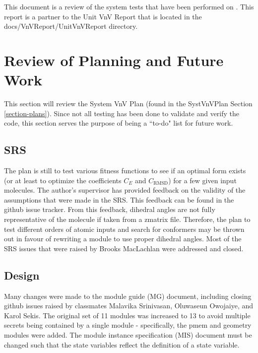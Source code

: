 \documentclass[12pt, titlepage]{article}
\begin{document}
\tableofcontents



\newpage


This document is a review of the system tests that have been performed on 
\progname{}. This report is a partner to the Unit VnV Report that is located in 
the docs/VnVReport/UnitVnVReport directory.

\section{Review of Planning and Future Work}

This section will review the System VnV Plan (found in the SystVnVPlan Section 
\ref{section-plans}). Since not all testing has been done to validate and 
verify the code, this section serves the purpose of being a ``to-do" list for 
future work.

\subsection{SRS}

The plan is still to test various fitness functions to see if an optimal form 
exists (or at least to optimize the coefficients $C_E$ and $C_\text{RMSD}$) for 
a few given input molecules. The author's supervisor has provided feedback on 
the validity of the assumptions that were made in the SRS. This feedback can be 
found in the github issue tracker. From this feedback, dihedral angles are not 
fully representative of the molecule if taken from a zmatrix file. Therefore, 
the plan to test different orders of atomic inputs and search for conformers 
may be thrown out in favour of rewriting a module to use proper dihedral 
angles. Most of the SRS issues that were raised by Brooks MacLachlan were 
addressed and closed.

\subsection{Design}

Many changes were made to the module guide (MG) document, including closing 
github issues raised by classmates Malavika Srinivasan, Oluwaseun Owojaiye, and 
Karol Sekis. The original set of 11 modules was increased to 13 to avoid 
multiple secrets being contained by a single module - specifically, the pmem 
and geometry modules were added. The module instance specification (MIS) 
document must be changed such that the state variables reflect the definition 
of a state variable.
\end{document}
